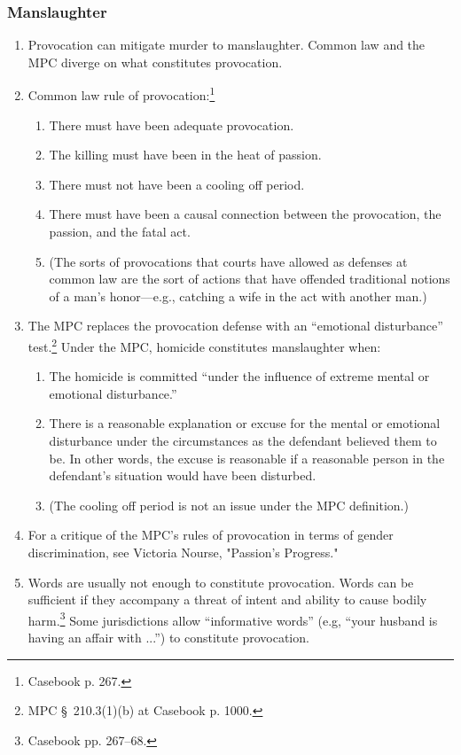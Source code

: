 \subsubsection{Manslaughter}

\begin{enumerate}
    \item Provocation can mitigate murder to manslaughter. Common law and the MPC diverge on what constitutes provocation.
    \item Common law rule of provocation:\footnote{Casebook p. 267.}
    \begin{enumerate}
        \item There must have been adequate provocation.
        \item The killing must have been in the heat of passion.
        \item There must not have been a cooling off period.
        \item There must have been a causal connection between the provocation, the passion, and the fatal act.
        \item (The sorts of provocations that courts have allowed as defenses at common law are the sort of actions that have offended traditional notions of a man's honor---e.g., catching a wife in the act with another man.)
    \end{enumerate}
    \item The MPC replaces the provocation defense with an ``emotional disturbance'' test.\footnote{MPC § 210.3(1)(b) at Casebook p. 1000.} Under the MPC, homicide constitutes manslaughter when:
    \begin{enumerate}
        \item The homicide is committed ``under the influence of extreme mental or emotional disturbance.''
        \item There is a reasonable explanation or excuse for the mental or emotional disturbance under the circumstances as the defendant believed them to be. In other words, the excuse is reasonable if a reasonable person in the defendant's situation would have been disturbed.
        \item (The cooling off period is not an issue under the MPC definition.)
    \end{enumerate}
    \item For a critique of the MPC's rules of provocation in terms of gender discrimination, see Victoria Nourse, "Passion's Progress."
    \item Words are usually not enough to constitute provocation. Words can be sufficient if they accompany a threat of intent and ability to cause bodily harm.\footnote{Casebook pp. 267--68.} Some jurisdictions allow ``informative words'' (e.g, ``your husband is having an affair with ...'') to constitute provocation.
\end{enumerate}

